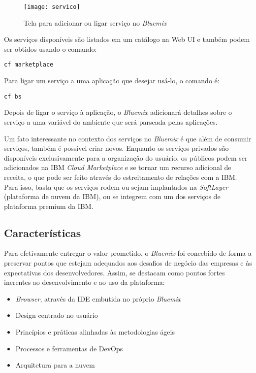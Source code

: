 \begin{figure}[!htb]
    \centering
    \texttt{[image: servico]}
    \caption{Tela para adicionar ou ligar serviço no \textit{Bluemix}}
    \label{Rotulo}
\end{figure}

Os serviços disponíveis são listados em um catálogo na Web UI e também podem ser obtidos usando o comando:
\begin{lstlisting}
cf marketplace
\end{lstlisting}

Para ligar um serviço a uma aplicação que desejar usá-lo, o comando é:
\begin{lstlisting}
cf bs
\end{lstlisting}

Depois de ligar o serviço à aplicação, o \textit{Bluemix} adicionará detalhes sobre o serviço a uma variável do ambiente que será parseada pelas aplicações.

Um fato interessante no contexto dos serviços no \textit{Bluemix} é que além de consumir serviços, também é possível criar novos. Enquanto os serviços privados são disponíveis exclusivamente para a organização do usuário, os públicos podem ser adicionados na IBM \textit{Cloud Marketplace} e se tornar um recurso adicional de receita, o que pode ser feito através do estreitamento de relações com a IBM. Para isso, basta que os serviços rodem ou sejam implantados na \textit{SoftLayer} (plataforma de nuvem da IBM), ou se integrem com um dos serviços de plataforma premium da IBM.

\subsection{Características}

Para efetivamente entregar o valor prometido, o \textit{Bluemix} foi concebido de forma a preservar pontos que estejam adequados aos desafios de negócio das empresas e às expectativas dos desenvolvedores. Assim, se destacam como pontos fortes inerentes ao desenvolvimento e ao uso da plataforma:
\begin{itemize}
    \item \textit{Browser}, através da IDE embutida no próprio \textit{Bluemix}
    \item  Design centrado no usuário
    \item  Princípios e práticas alinhadas às metodologias ágeis
    \item  Processos e ferramentas de DevOps
    \item  Arquitetura para a nuvem
\end{itemize}

